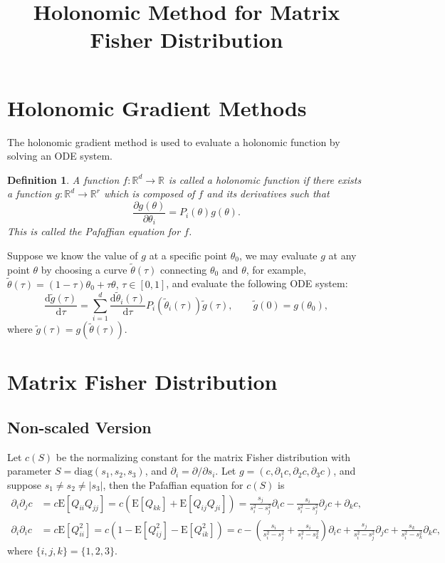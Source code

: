 \documentclass[10pt]{article}
\title{\vspace{-4ex}\textbf{Holonomic Method for Matrix Fisher Distribution\vspace{-4ex}}}
\date{}
\newtheorem{definition}{Definition}
\newcommand{\expect}[1]{\ensuremath{\mathrm{E}\left[ #1 \right]}}
\newcommand{\real}[1]{\ensuremath{\mathbb{R}^{ #1 }}}
\newcommand{\diff}[1]{\ensuremath{\mathrm{d} #1}}
\begin{document}
\maketitle

\section{Holonomic Gradient Methods}

The holonomic gradient method is used to evaluate a holonomic function by solving an ODE system.

\begin{definition}
	A function $f:\real{d}\to\real{}$ is called a holonomic function if there exists a function $g:\real{d}\to\real{r}$ which is composed of $f$ and its derivatives such that
	\begin{equation}
		\frac{\partial g(\theta)}{\partial \theta_i} = P_i(\theta) g(\theta).
	\end{equation}
	This is called the Pafaffian equation for $f$.
\end{definition}

Suppose we know the value of $g$ at a specific point $\theta_0$, we may evaluate $g$ at any point $\theta$ by choosing a curve $\tilde{\theta}(\tau)$ connecting $\theta_0$ and $\theta$, for example, $\tilde{\theta}(\tau) = (1-\tau)\theta_0+\tau\theta, \, \tau\in[0,1]$, and evaluate the following ODE system:
\begin{equation}
	\frac{\diff{\tilde{g}(\tau)}}{\diff{\tau}} = \sum_{i=1}^{d} \frac{\diff{\tilde{\theta}_i(\tau)}}{\diff{\tau}} P_i(\tilde{\theta}_i(\tau)) \tilde{g}(\tau), \qquad \tilde{g}(0) = g(\theta_0),
\end{equation}
where $\tilde{g}(\tau) = g(\tilde{\theta}(\tau))$.

\section{Matrix Fisher Distribution}

\subsection{Non-scaled Version}
Let $c(S)$ be the normalizing constant for the matrix Fisher distribution with parameter $S=\mathrm{diag}(s_1,s_2,s_3)$, and $\partial_i = \partial /\partial s_i$.
Let $g = (c,\partial_1c,\partial_2c,\partial_3c)$, and suppose $s_1 \neq s_2 \neq |s_3|$, then the Pafaffian equation for $c(S)$ is
\begin{align}
	\partial_i\partial_jc &= c\expect{Q_{ii}Q_{jj}} = c(\expect{Q_{kk}}+\expect{Q_{ij}Q_{ji}}) = \frac{s_j}{s_i^2-s_j^2}\partial_ic - \frac{s_i}{s_i^2-s_j^2}\partial_jc + \partial_kc, \\
	\partial_i\partial_ic &= c\expect{Q_{ii}^2} = c(1-\expect{Q_{ij}^2}-\expect{Q_{ik}^2}) = c - \left(\frac{s_i}{s_i^2-s_j^2}+\frac{s_i}{s_i^2-s_k^2}\right)\partial_ic + \frac{s_j}{s_i^2-s_j^2}\partial_jc + \frac{s_k}{s_i^2-s_k^2}\partial_kc,
\end{align}
where $\{i,j,k\}=\{1,2,3\}$.
\end{document}
